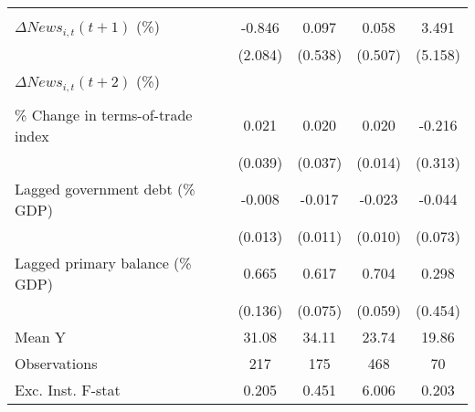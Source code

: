{\begin{tabular}{l*{4}{c}}
                    &                     &                     &                     &                     \\
\addlinespace
$ \Delta News_{i,t}(t+1)$ (\%)&      -0.846         &       0.097         &       0.058         &       3.491         \\
                    &     (2.084)         &     (0.538)         &     (0.507)         &     (5.158)         \\
\addlinespace
$ \Delta News_{i,t}(t+2)$ (\%)&                     &                     &                     &                     \\
                    &                     &                     &                     &                     \\
\addlinespace
\% Change in terms-of-trade index&       0.021         &       0.020         &       0.020         &      -0.216         \\
                    &     (0.039)         &     (0.037)         &     (0.014)         &     (0.313)         \\
\addlinespace
Lagged government debt (\% GDP)&      -0.008         &      -0.017         &      -0.023\sym{**} &      -0.044         \\
                    &     (0.013)         &     (0.011)         &     (0.010)         &     (0.073)         \\
\addlinespace
Lagged primary balance (\% GDP)&       0.665\sym{***}&       0.617\sym{***}&       0.704\sym{***}&       0.298         \\
                    &     (0.136)         &     (0.075)         &     (0.059)         &     (0.454)         \\
\midrule
Mean Y              &       31.08         &       34.11         &       23.74         &       19.86         \\
Observations        &         217         &         175         &         468         &          70         \\
Exc. Inst. F-stat   &       0.205         &       0.451         &       6.006         &       0.203         \\
\bottomrule
\end{tabular}
}
